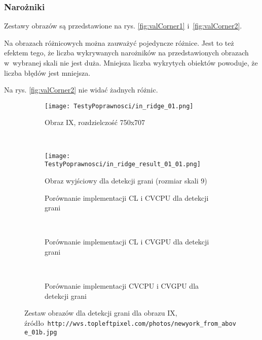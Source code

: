\subsubsection{Narożniki}
\label{subsubsec:naroznikiRysunki}

Zestawy obrazów są przedstawione na rys. \ref{fig:valCorner1} i~\ref{fig:valCorner2}. 

Na obrazach różnicowych można zauważyć pojedyncze różnice. Jest to też efektem tego, że liczba wykrywanych narożników na przedstawionych obrazach w~wybranej skali nie jest duża. Mniejsza liczba wykrytych obiektów powoduje, że liczba błędów jest mniejsza.

Na rys. \ref{fig:valCorner2} nie widać żadnych różnic.

\begin{figure}[h]

\begin{center}
\begin{subfigure}[t]{0.3\textwidth}
\texttt{[image: TestyPoprawnosci/in\_ridge\_01.png]}
\caption{Obraz IX, rozdzielczość 750x707}
\label{fig:valRidge01}
\end{subfigure}
~
\begin{subfigure}[t]{0.3\textwidth}
\texttt{[image: TestyPoprawnosci/in\_ridge\_result\_01\_01.png]}
\caption{Obraz wyjściowy dla detekcji grani (rozmiar skali 9)}
\label{fig:valRidgeResult01}
\end{subfigure}
\end{center}

\begin{subfigure}[t]{0.3\textwidth}
	\centering
	\setlength\fboxsep{0pt}
	\setlength\fboxrule{0.5pt}
	\caption{Porównanie implementacji CL i CVCPU dla detekcji grani}
	\label{fig:valRidge1CLCVCPU}
\end{subfigure}
~
\begin{subfigure}[t]{0.3\textwidth}
	\centering
	\setlength\fboxsep{0pt}
	\setlength\fboxrule{0.5pt}
	\caption{Porównanie implementacji CL i CVGPU dla detekcji grani}
	\label{fig:valRidge1CLCVGPU}
\end{subfigure}
~
\begin{subfigure}[t]{0.3\textwidth}
	\centering
	\setlength\fboxsep{0pt}
	\setlength\fboxrule{0.5pt}
	\caption{Porównanie implementacji CVCPU i CVGPU dla detekcji grani}
	\label{fig:valRidge1CVCPUCVGPU}                 
\end{subfigure}
\caption{Zestaw obrazów dla detekcji grani dla obrazu IX, \tiny{źródło~\texttt{http://wvs.topleftpixel.com/photos/newyork\_from\_above\_01b.jpg}}}

\label{fig:valRidge1}
\end{figure}

